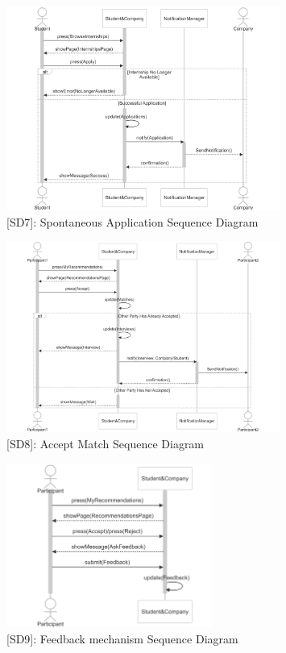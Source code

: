 \begin{figure}
    \centering
    \includegraphics[width=0.8\textwidth]{Latex/Images/SpontaneousApplicationSequenceDiagram.png}
    \caption{[SD7]: Spontaneous Application Sequence Diagram}
    \label{fig:SD7}
\end{figure}

\begin{figure}
    \centering
    \includegraphics[width=0.8\textwidth]{Latex/Images/AcceptMatchSequenceDiagram.png}
    \caption{[SD8]: Accept Match Sequence Diagram}
    \label{fig:SD8}
\end{figure}
\clearpage

\begin{figure}
    \centering
    \includegraphics[width=0.6\textwidth]{Latex/Images/FeedbackMechanismSequenceDiagram.png}
    \caption{[SD9]: Feedback mechanism Sequence Diagram}
    \label{fig:SD9}
\end{figure}

